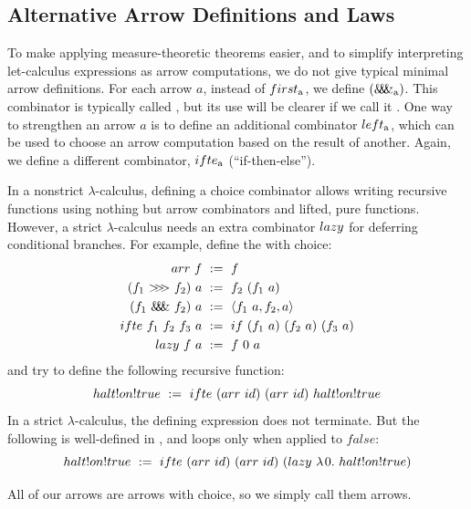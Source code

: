 \subsection{Alternative Arrow Definitions and Laws}
\label{sec:arrow-definitions}

To make applying measure-theoretic theorems easier, and to simplify interpreting let-calculus expressions as arrow computations, we do not give typical minimal arrow definitions.
For each arrow $a$, instead of $first_\mathrm{a}$, we define $(\mathit{\&\mspace{-7.5mu}\&\mspace{-7.5mu}\&}_\mathrm{a})$.
This combinator is typically called , but its use will be clearer if we call it .
One way to strengthen an arrow $a$ is to define an additional combinator $left_\mathrm{a}$, which can be used to choose an arrow computation based on the result of another.
Again, we define a different combinator, $ifte_\mathrm{a}$ (``if-then-else'').

In a nonstrict $\lambda$-calculus, defining a choice combinator allows writing recursive functions using nothing but arrow combinators and lifted, pure functions.
However, a strict $\lambda$-calculus needs an extra combinator $lazy$ for deferring conditional branches.
For example, define the  with choice:
\begin{equation}
\begin{aligned}
	arr~f &\ := \ f \\
	(f_1~{>}\mspace{-6mu}{>}\mspace{-6mu}{>}~f_2)~a &\ := \ f_2~(f_1~a) \\
	(f_1~\mathit{\&\mspace{-7.5mu}\&\mspace{-7.5mu}\&}~f_2)~a &\ := \ \langle{f_1~a,f_2,a}\rangle \\
	ifte~f_1~f_2~f_3~a &\ := \ if~(f_1~a)~(f_2~a)~(f_3~a) \\
	lazy~f~a &\ :=\ f~0~a
\end{aligned}
\label{eqn:function-arrow}
\end{equation}
and try to define the following recursive function:
\begin{equation}
	halt!on!true \ := \ \arrowif~(\arrowarr~id)~(\arrowarr~id)~halt!on!true
\end{equation}
In a strict $\lambda$-calculus, the defining expression does not terminate.
But the following is well-defined in \lzfclang, and loops only when applied to $false$:
\begin{equation}
	halt!on!true \ := \ \arrowif~(\arrowarr~id)~(\arrowarr~id)~(\arrowlazy~\fun{0}{halt!on!true})
\end{equation}

All of our arrows are arrows with choice, so we simply call them arrows.

